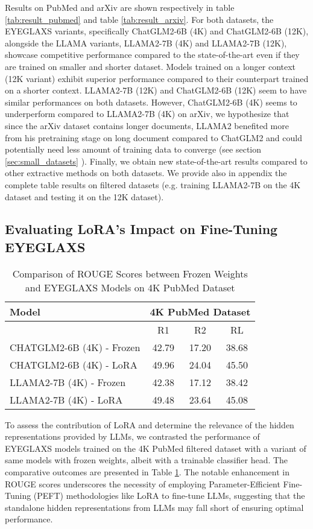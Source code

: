 Results on PubMed and arXiv are shown respectively in table \ref{tab:result_pubmed} and table \ref{tab:result_arxiv}. For both datasets, the EYEGLAXS variants, specifically ChatGLM2-6B (4K) and ChatGLM2-6B (12K), alongside the LLAMA variants, LLAMA2-7B (4K) and LLAMA2-7B (12K), showcase competitive performance compared to the state-of-the-art even if they are trained on smaller and shorter dataset. Models trained on a longer context (12K variant) exhibit superior performance compared to their counterpart trained on a shorter context. LLAMA2-7B (12K) and ChatGLM2-6B (12K) seem to have similar performances on both datasets. However, ChatGLM2-6B (4K) seems to underperform compared to LLAMA2-7B (4K) on arXiv, we hypothesize that since the arXiv dataset contains longer documents, LLAMA2 benefited more from his pretraining stage on long document compared to ChatGLM2 and could potentially need less amount of training data to converge (see section \ref{sec:small_datasets} ). Finally, we obtain new state-of-the-art results compared to other extractive methods on both datasets. We provide also in appendix the complete table results on filtered datasets (e.g. training LLAMA2-7B on the 4K dataset and testing it on the 12K dataset).

\subsection{Evaluating LoRA's Impact on Fine-Tuning EYEGLAXS}
\begin{table}
    \centering
    \small
    \begin{tabular}{|l|c|c|c|} \hline  
 Model& \multicolumn{3}{|c|}{4K PubMed Dataset}\\ \hline  
 & R1& R2& RL\\ \hline  
CHATGLM2-6B (4K) - Frozen& 42.79& 17.20& 38.68\\ \hline 
CHATGLM2-6B (4K) - LoRA& 49.96& 24.04& 45.50\\ \hline  
LLAMA2-7B (4K) - Frozen& 42.38& 17.12& 38.42\\ \hline 
LLAMA2-7B (4K) - LoRA& 49.48& 23.64& 45.08\\ \hline  

    \end{tabular}
    \caption{Comparison of ROUGE Scores between Frozen Weights and EYEGLAXS Models on 4K PubMed Dataset}
    \label{tab:LoRA_frozen}
\end{table}

To assess the contribution of LoRA and determine the relevance of the hidden representations provided by LLMs, we contrasted the performance of EYEGLAXS models trained on the 4K PubMed filtered dataset with a variant of same models with frozen weights, albeit with a trainable classifier head. The comparative outcomes are presented in Table \ref{tab:LoRA_frozen}. The notable enhancement in ROUGE scores underscores the necessity of employing Parameter-Efficient Fine-Tuning (PEFT) methodologies like LoRA to fine-tune LLMs, suggesting that the standalone hidden representations from LLMs may fall short of ensuring optimal performance.

